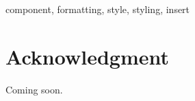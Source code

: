 \documentclass[10pt,conference]{IEEEtran}
\begin{document}
\begin{IEEEkeywords}
component, formatting, style, styling, insert
\end{IEEEkeywords}











\section*{Acknowledgment}
Coming soon.



\end{document}
